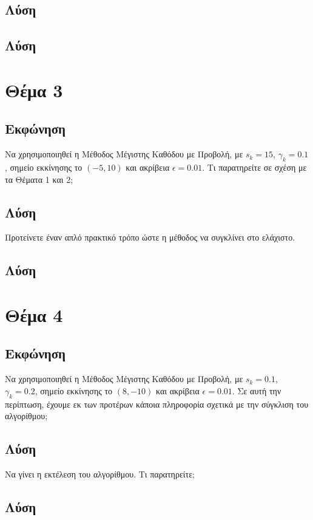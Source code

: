 \documentclass{report}
\begin{document}
\section{Λύση}
\section{Λύση}


% 
\chapter{Θέμα 3}
\section{Εκφώνηση}
Να χρησιμοποιηθεί η Μέθοδος Μέγιστης Καθόδου με Προβολή, με $s_k = 15$, $\gamma_k = 0.1$,
σημείο εκκίνησης το $(-5,10)$ και ακρίβεια $\epsilon = 0.01$. Τι παρατηρείτε σε σχέση με τα Θέματα 1 
και 2;
\section{Λύση} Προτείνετε έναν απλό πρακτικό τρόπο ώστε η μέθοδος να συγκλίνει στο ελάχιστο.
\section{Λύση}


% 
\chapter{Θέμα 4}
\section{Εκφώνηση}
Να χρησιμοποιηθεί η Μέθοδος Μέγιστης Καθόδου με Προβολή, με $s_k = 0.1$, $\gamma_k = 0.2$,
σημείο εκκίνησης το $(8, -10)$ και ακρίβεια $\epsilon = 0.01$. Σε αυτή την περίπτωση, έχουμε εκ των
προτέρων κάποια πληροφορία σχετικά με την σύγκλιση του αλγορίθμου;
\section{Λύση} Να γίνει η εκτέλεση του
αλγορίθμου. Τι παρατηρείτε;
\section{Λύση}
\end{document}

